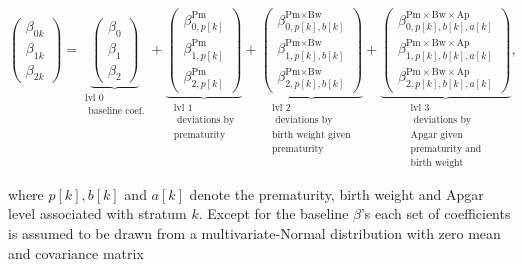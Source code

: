 \documentclass[10pt,twoside,reqno]{article}
\begin{document}
\[
\left(\begin{aligned}
\beta_{0k} \\
\beta_{1k} \\
\beta_{2k}
\end{aligned}\right) =
\underbrace{\left(\begin{aligned}
\beta_0 \\
\beta_1 \\
\beta_2
\end{aligned}\right)}_{\substack{\text{lvl 0} \\ \text{ baseline coef.}}} +
\underbrace{\left(\begin{aligned}
\beta_{0,p[k]}^\text{Pm} \\
\beta_{1,p[k]}^\text{Pm} \\
\beta_{2,p[k]}^\text{Pm}
\end{aligned}\right)}_{\substack{\text{lvl 1} \\ \text{ deviations by} \\ \text{prematurity}}} +
\underbrace{\left(\begin{aligned}
\beta_{0,p[k],b[k]}^{\text{Pm}\times\text{Bw}} \\
\beta_{1,p[k],b[k]}^{\text{Pm}\times\text{Bw}} \\
\beta_{2,p[k],b[k]}^{\text{Pm}\times\text{Bw}}
\end{aligned}\right)}_{\substack{\text{lvl 2} \\ \text{ deviations by} \\ \text{birth weight given} \\ \text{prematurity}}} +
\underbrace{\left(\begin{aligned}
\beta_{0,p[k],b[k],a[k]}^{\text{Pm}\times\text{Bw}\times\text{Ap}} \\
\beta_{1,p[k],b[k],a[k]}^{\text{Pm}\times\text{Bw}\times\text{Ap}} \\
\beta_{2,p[k],b[k],a[k]}^{\text{Pm}\times\text{Bw}\times\text{Ap}}
\end{aligned}\right)}_{\substack{\text{lvl 3} \\ \text{ deviations by} \\ \text{Apgar given} \\ \text{prematurity and} \\ \text{birth weight}}},
\]

where \(p[k], b[k]\) and \(a[k]\) denote the prematurity, birth weight and Apgar level associated with stratum \(k\). Except for the baseline \(\beta\)'s each set of coefficients is assumed to be drawn from a multivariate-Normal distribution with zero mean and covariance matrix
\end{document}
